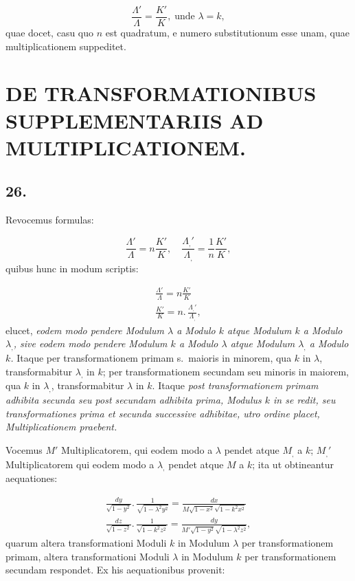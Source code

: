 \documentclass{article}
\begin{document}
\[
\frac{\Lambda'}{\Lambda}=\frac{K'}{K},\;\text{unde }\lambda=k,
\]
quae docet, casu quo $n$ est quadratum, e numero substitutionum esse unam, quae multiplicationem suppeditet.

\section*{DE TRANSFORMATIONIBUS SUPPLEMENTARIIS AD MULTIPLICATIONEM.}

\subsection*{26.}

Revocemus formulas:

\[
\frac{\Lambda'}{\Lambda}=n\frac{K'}{K},\quad\frac{\Lambda_{,}'}{\Lambda_{,}}=\frac{1}{n}\frac{K'}{K},
\]
quibus hunc in modum scriptis:

\[
\begin{gathered}
\frac{\Lambda'}{\Lambda}=n\frac{K'}{K}\\[1.5ex]
\frac{K'}{K}=n.\,\frac{\Lambda_{,}'}{\Lambda_{,}},
\end{gathered}
\]
elucet, \emph{eodem modo pendere Modulum $\lambda$ a Modulo $k$ atque Modulum $k$ a Modulo $\lambda_{,}$, sive eodem modo pendere Modulum $k$ a Modulo $\lambda$ atque Modulum $\lambda_{,}$ a Modulo $k$.} Itaque per transformationem primam s.\ maioris in minorem, qua $k$ in $\lambda$, transformabitur $\lambda_{,}$ in $k$; per transformationem secundam seu minoris in maiorem, qua $k$ in $\lambda_{,}$, transformabitur $\lambda$ in $k$. Itaque \emph{post transformationem primam adhibita secunda seu post secundam adhibita prima, Modulus $k$ in se redit, seu transformationes prima et secunda successive adhibitae, utro ordine placet, Multiplicationem praebent.}

Vocemus $M'$ Multiplicatorem, qui eodem modo a $\lambda$ pendet atque $M_{,}$ a $k$; $M_{,}'$ Multiplicatorem qui eodem modo a $\lambda_{,}$ pendet atque $M$ a $k$; ita ut obtineantur aequationes:

\[
\begin{gathered}
\frac{dy}{\sqrt{1-y^{2}}}.\,\frac{1}{\sqrt{1-\lambda^{2}y^{2}}}=\frac{dx}{M\sqrt{1-x^{2}}\sqrt{1-k^{2}x^{2}}}\\[2ex]
\frac{dz}{\sqrt{1-z^{2}}}.\,\frac{1}{\sqrt{1-k^{2}z^{2}}}=\frac{dy}{M'\sqrt{1-y^{2}}\sqrt{1-\lambda^{2}z^{2}}},
\end{gathered}
\]
quarum altera transformationi Moduli $k$ in Modulum $\lambda$ per transformationem primam, altera transformationi Moduli $\lambda$ in Modulum $k$ per transformationem secundam respondet. Ex his aequationibus provenit:
\end{document}
